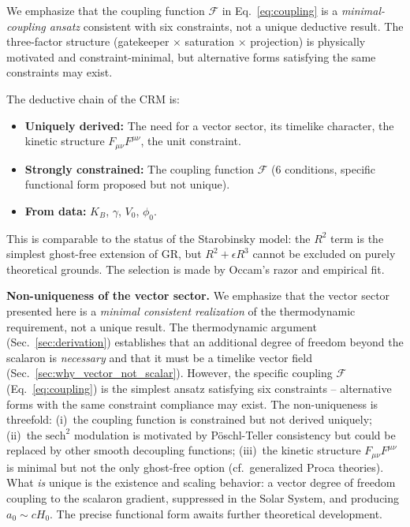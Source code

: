 \documentclass[aps,prd,twocolumn,superscriptaddress,nofootinbib]{revtex4-2}
\begin{document}
We emphasize that the coupling function $\mathcal{F}$ in Eq.~\eqref{eq:coupling} is a \textit{minimal-coupling ansatz} consistent with six constraints, not a unique deductive result. The three-factor structure (gatekeeper $\times$ saturation $\times$ projection) is physically motivated and constraint-minimal, but alternative forms satisfying the same constraints may exist.

The deductive chain of the CRM is:
\begin{itemize}
\item \textbf{Uniquely derived:} The need for a vector sector, its timelike character, the kinetic structure $F_{\mu\nu}F^{\mu\nu}$, the unit constraint.
\item \textbf{Strongly constrained:} The coupling function $\mathcal{F}$ (6 conditions, specific functional form proposed but not unique).
\item \textbf{From data:} $K_B$, $\gamma$, $V_0$, $\phi_0$.
\end{itemize}

This is comparable to the status of the Starobinsky model: the $R^2$ term is the simplest ghost-free extension of GR, but $R^2 + \epsilon R^3$ cannot be excluded on purely theoretical grounds. The selection is made by Occam's razor and empirical fit.

\textbf{Non-uniqueness of the vector sector.} We emphasize that the vector sector presented here is a \emph{minimal consistent realization} of the thermodynamic requirement, not a unique result. The thermodynamic argument (Sec.~\ref{sec:derivation}) establishes that an additional degree of freedom beyond the scalaron is \emph{necessary} and that it must be a timelike vector field (Sec.~\ref{sec:why_vector_not_scalar}). However, the specific coupling $\mathcal{F}$ (Eq.~\ref{eq:coupling}) is the simplest ansatz satisfying six constraints -- alternative forms with the same constraint compliance may exist. The non-uniqueness is threefold: (i)~the coupling function is constrained but not derived uniquely; (ii)~the $\mathrm{sech}^2$ modulation is motivated by P\"oschl-Teller consistency but could be replaced by other smooth decoupling functions; (iii)~the kinetic structure $F_{\mu\nu}F^{\mu\nu}$ is minimal but not the only ghost-free option (cf.\ generalized Proca theories). What \emph{is} unique is the existence and scaling behavior: a vector degree of freedom coupling to the scalaron gradient, suppressed in the Solar System, and producing $a_0 \sim cH_0$. The precise functional form awaits further theoretical development.
\end{document}
